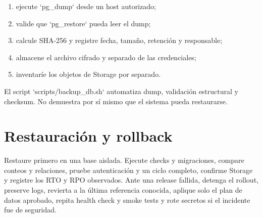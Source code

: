 \begin{enumerate}
  \item ejecute `pg\_dump` desde un host autorizado;
  \item valide que `pg\_restore` pueda leer el dump;
  \item calcule SHA-256 y registre fecha, tamaño, retención y responsable;
  \item almacene el archivo cifrado y separado de las credenciales;
  \item inventaríe los objetos de Storage por separado.
\end{enumerate}

El script `scripts/backup\_db.sh` automatiza dump, validación estructural y checksum. No demuestra
por sí mismo que el sistema pueda restaurarse.

\section{Restauración y rollback}

Restaure primero en una base aislada. Ejecute checks y migraciones, compare conteos y relaciones,
pruebe autenticación y un ciclo completo, confirme Storage y registre los RTO y RPO observados. Ante
una release fallida, detenga el rollout, preserve logs, revierta a la última referencia conocida,
aplique solo el plan de datos aprobado, repita health check y smoke tests y rote secretos si el
incidente fue de seguridad.
